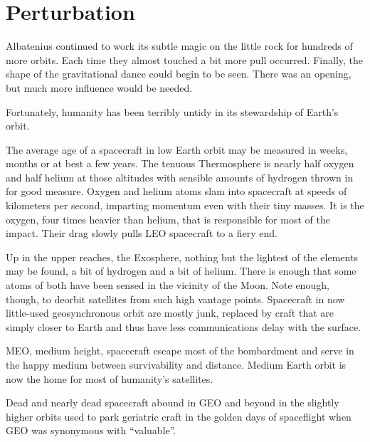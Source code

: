 %
%

\chapter{Perturbation}

Albatenius continued to work its subtle magic on the little rock for hundreds of more orbits. Each time they almost touched a bit more pull occurred. Finally, the shape of the gravitational dance could begin to be seen. There was an opening, but much more influence would be needed.

Fortunately, humanity has been terribly untidy in its stewardship of Earth's orbit.

The average age of a spacecraft in low Earth orbit may be measured in weeks, months or at best a few years. The tenuous Thermosphere is nearly half oxygen and half helium at those altitudes with sensible amounts of hydrogen thrown in for good measure. Oxygen and helium atoms slam into spacecraft at speeds of kilometers per second, imparting momentum even with their tiny masses. It is the oxygen, four times heavier than helium, that is responsible for most of the impact. Their drag slowly pulls LEO spacecraft to a fiery end.

Up in the upper reaches, the Exosphere, nothing but the lightest of the elements may be found, a bit of hydrogen and a bit of helium. There is enough that some atoms of both have been sensed in the vicinity of the Moon. Note enough, though, to deorbit satellites from such high vantage points. Spacecraft in now little-used geosynchronous orbit are mostly junk, replaced by craft that are simply closer to Earth and thus have less communications delay with the surface.

MEO, medium height, spacecraft escape most of the bombardment and serve in the happy medium between survivability and distance. Medium Earth orbit is now the home for most of humanity's satellites.

Dead and nearly dead spacecraft abound in GEO and beyond in the slightly higher orbits used to park geriatric craft in the golden days of spaceflight when GEO was synonymous with ``valuable''.

\begin{itemize}
\item{Several other spacecraft are engaged.}
\item The tiny NEO is diverted into a horseshoe orbit around Earth.}
\item{The asteroid throws Albatenius out of Earth orbit toward the asteroid belt.
\end{itemize}

\newpage
\thispagestyle{empty}